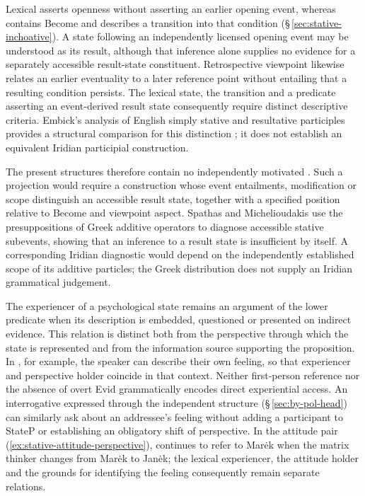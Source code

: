 Lexical   asserts openness without
asserting an earlier opening event, whereas  contains
Become and describes a transition into that condition
(\S\,\ref{sec:stative-inchoative}). A state following an independently
licensed opening event may be understood as its result, although that
inference alone supplies no evidence for a separately accessible
result-state constituent. Retrospective viewpoint likewise relates an
earlier eventuality to a later reference point without entailing that a
resulting condition persists. The lexical state, the transition and a
predicate asserting an event-derived result state consequently require
distinct descriptive criteria. Embick's analysis of English simply
stative and resultative participles provides a structural comparison for
this distinction \cite[\S1]{embick2004resultative}; it does not establish
an equivalent Iridian participial construction.

The present structures therefore contain no independently motivated
. Such a projection would require a construction whose
event entailments, modification or scope distinguish an accessible
result state, together with a specified position relative to Become and
viewpoint aspect. Spathas and Michelioudakis
\cite[\S\S1--3]{spathasmichelioudakis2021} use the presuppositions of
Greek additive operators to diagnose accessible stative subevents,
showing that an inference to a result state is insufficient by itself.
A corresponding Iridian diagnostic would depend on the independently
established scope of its additive particles; the Greek distribution
does not supply an Iridian grammatical judgement.

The experiencer of a psychological state remains an argument of the
lower predicate when its description is embedded, questioned or presented
on indirect evidence. This relation is distinct both from the perspective
through which the state is represented and from the information source
supporting the proposition. In , for example, the
speaker can describe their own feeling, so that experiencer and
perspective holder coincide in that context. Neither first-person
reference nor the absence of overt Evid grammatically encodes direct
experiential access. An interrogative expressed through the independent
 structure (\S\,\ref{sec:by-pol-head}) can similarly ask
about an addressee's feeling without adding a participant to StateP or
establishing an obligatory shift of perspective. In the attitude pair
(\ref{ex:stative-attitude-perspective}),  continues to refer to
Marėk when the matrix thinker changes from Marėk to Janėk; the lexical
experiencer, the attitude holder and the grounds for identifying the
feeling consequently remain separate relations.

